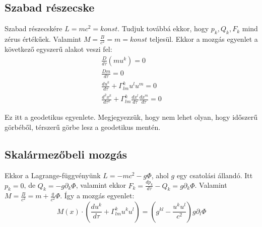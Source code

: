 \documentclass[a4paper,12pt]{article}
\begin{document}
\subsection{ Szabad részecske}
\par Szabad részecskére $L = mc^{2} = konst$. Tudjuk továbbá ekkor, hogy $p_{k}, Q_{k}, F_{k}$ mind zérus értékűek. Valamint $M = \frac{B}{c^{2}} = m = konst$ teljesül. Ekkor a mozgás egyenlet a következő egyszerű alakot veszi fel: 
\begin{gather*}
    \frac{D}{d\tau}(mu^{k}) = 0 \\
    \frac{Dm}{d\tau} = 0 \\
    \frac{du^{k}}{d\tau} + \Gamma_{lm}^{k}u^{l}u^{m} = 0 \\
    \frac{d^{2}x^{k}}{d\tau^{2}} + \Gamma_{lm}^{k}\frac{dx^{l}}{d\tau}\frac{dx^{m}}{d\tau} = 0
\end{gather*}
\par Ez itt a geodetikus egyenlete. Megjegyezzük, hogy nem lehet olyan, hogy időszerű görbéből, térszerű görbe lesz a geodetikus mentén.
\subsection{ Skalármezőbeli mozgás}
\par Ekkor a Lagrange-függvényünk $L = -mc^{2} - g\Phi$, ahol $g$ egy csatolási állandó. Itt $p_{k} = 0$, de $Q_{k} = -g\partial_{k}\Phi$, valamint ekkor $F_{k} = \frac{dp_{k}}{d\tau} - Q_{k} = g\partial_{k}\Phi$. Valamint $M = \frac{B}{c^{2}} = m + \frac{g}{c^{2}}\Phi$. Így a mozgás egyenlet:
\begin{equation*}
    M(x)\cdot(\frac{du^{k}}{d\tau} + \Gamma_{lm}^{k}u^{k}u^{l}) = (g^{kl} - \frac{u^{k}u^{l}}{c^{2}})g\partial_{l}\Phi
\end{equation*}
\end{document}
